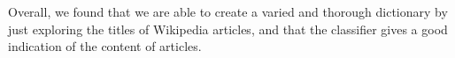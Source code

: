 Overall, we found that we are able to create a varied and thorough dictionary by just exploring %
the titles of Wikipedia articles, and that the classifier gives a good indication of the content of articles. 


\begin{comment}

form??? 

"explain" -> tanken bak er enkel. 


Brokers are often not very technical and by experience will have severe problems developing training sets or otherwise contribute to the process, so any required involvement from their side has to be relatively simple. Furthermore, it is a practical requirement that the classifier can “explain” its classification to the broker in some way, and that the broker can have a simple way to manually override or influence the classification of known problem cases.

We explore the use of Wikipedia to develop a simple dictionary-based classifier. A dictionary-based classifier offers a simple way to “explain” the classification, and allows the classification vocabulary (i.e., the dictionary entries) to be easily edited. Wikipedia exists in a large number of languages, has a large number of article keywords covering most domains, and explicitly associates article names with categories. We describe a set of tools that automate the process of building up dictionaries that map Wikipedia keywords (or cleansed versions thereof) into Wikipedia categories (or modified versions thereof). Creating a mapping that maps Wikipedia categories into the broker’s custom taxonomy tree is a relatively straightforward task that brokers (or people working on their behalf) are assumed capable of. We will here use predefined a taxonomy, the one provided by IAB, as a working example of such a custom taxonomy tree.

Given such a classifier, we describe an experiment using a real advertising platform to validate its use in real life using real data. We also provide a brief overview of related work described in the literature.

\end{comment}